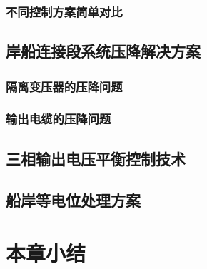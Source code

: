 \subsubsection{不同控制方案简单对比}




\subsection{岸船连接段系统压降解决方案}

\subsubsection{隔离变压器的压降问题}
\subsubsection{输出电缆的压降问题}


\subsection{三相输出电压平衡控制技术}
\subsection{船岸等电位处理方案}



\section{本章小结}


